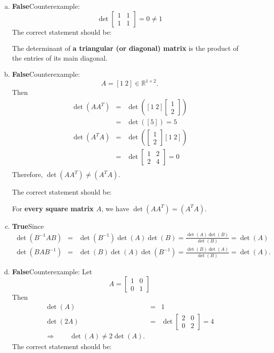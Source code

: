 \vspace{2mm}
\begin{enumerate}[a)]
  \item \textbf{False}\qquad Counterexample:
$$
\det\left[\begin{array}{cc}1&1\\1&1\end{array}\right]=0\neq 1
$$
The correct statement should be:

The determinant of \textbf{a triangular (or diagonal) matrix} is the product of the entries of its main diagonal.
	\item \textbf{False}\qquad Counterexample:
$$
A=[1\hspace{3pt}2]\in\mathbb{R}^{1\times2}.
$$
Then
\begin{eqnarray*}
  \det(AA^T)&=&\det\left([1\hspace{3pt}2]\left[\begin{array}{c}1\\2\end{array}\right]\right)\\
	&=&\det([5])=5\\
  \det(A^TA)&=&\det\left(\left[\begin{array}{c}1\\2\end{array}\right][1\hspace{3pt}2]\right)\\
	&=&\det\left[\begin{array}{cc}1&2\\2&4\end{array}\right]=0\\
\end{eqnarray*}
Therefore, $\det(AA^T)\neq(A^TA)$.

The correct statement should be:

For \textbf{every square matrix $A$}, we have  $\det(AA^T)=(A^TA)$.
	\item \textbf{True}\qquad Since
\begin{eqnarray*}
\det(B^{-1}AB)&=&\det(B^{-1})\det(A)\det(B)=\frac{\det(A)\det(B)}{\det(B)}=\det(A)\\
\det(BAB^{-1})&=&\det(B)\det(A)\det(B^{-1})=\frac{\det(B)\det(A)}{\det(B)}=\det(A).
\end{eqnarray*}
\item \textbf{False}\qquad Counterexample: Let
$$
A=\left[\begin{array}{cc}1&0\\0&1\end{array}\right]
$$
Then
\begin{eqnarray*}
  \det(A)&=&1\\
	\det(2A)&=&\det\left[\begin{array}{cc}2&0\\0&2\end{array}\right]=4\\
	\Rightarrow\qquad\det(A)\neq2\det(A).
\end{eqnarray*}
The correct statement should be:


\end{enumerate}
